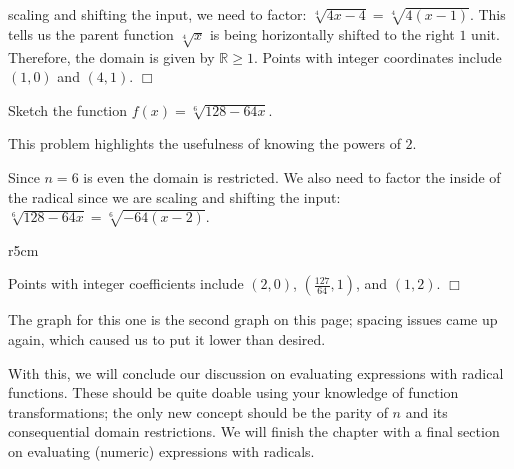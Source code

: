 \documentclass[lang=en,11pt]{elegantbook}
\begin{document}
\noindent scaling and shifting the input, we need to factor: $\sqrt[4]{4x-4}=\sqrt[4]{4(x-1)}$. This tells us the parent function $\sqrt[4]{x}$ is being horizontally shifted to the right $1$ unit. Therefore, the domain is given by $\mathbb{R}\geq 1$. Points with integer coordinates include $(1,0)$ and $(4,1)$. $\Box$

\begin{example}
Sketch the function $f(x)=\sqrt[6]{128-64x}$.
\end{example}
\begin{solution}
This problem highlights the usefulness of knowing the powers of $2$.

Since $n=6$ is even the domain is restricted. We also need to factor the inside of the radical since we are scaling and shifting the input: $\sqrt[6]{128-64x}=\sqrt[6]{-64(x-2)}$.
\end{solution}

\begin{wrapfigure}{r}{5cm}
\end{wrapfigure}

Points with integer coefficients include $(2,0)$, $(\frac{127}{64},1)$, and $(1,2)$. $\Box$

\begin{remark}
The graph for this one is the second graph on this page; spacing issues came up again, which caused us to put it lower than desired.
\end{remark}

With this, we will conclude our discussion on evaluating expressions with radical functions.  These should be quite doable using your knowledge of function transformations; the only new concept should be the parity of $n$ and its consequential domain restrictions.  We will finish the chapter with a final section on evaluating (numeric) expressions with radicals.
\end{document}
